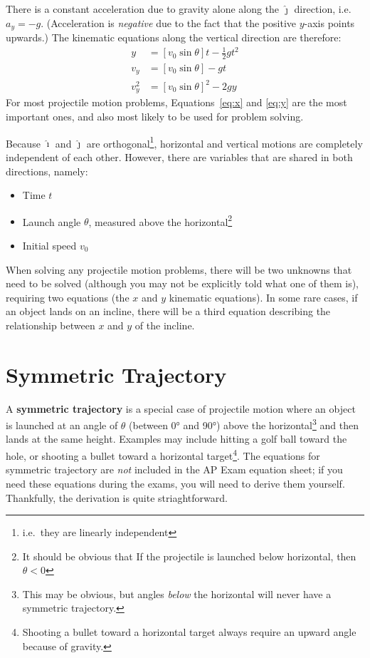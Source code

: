 \documentclass{../../../oss-handout}
\newcommand{\iii}{\bm{\hat{\imath}}}
\newcommand{\jjj}{\bm{\hat{\jmath}}}
\begin{document}
There is a constant acceleration due to gravity alone along the $\jjj$
direction, i.e.\ $a_y=-g$. (Acceleration is \emph{negative} due to the fact that
the positive $y$-axis points upwards.) The kinematic equations along the
vertical direction are therefore:
\begin{align}
  y &= \left[v_0\sin\theta\right]t-\frac12gt^2\label{eq:y}\\
  v_y &= \left[v_0\sin\theta\right] -gt\\
  v_y^2&=\left[v_0\sin\theta\right]^2-2gy
\end{align}
For most projectile motion problems, Equations~\ref{eq:x} and \ref{eq:y} are
the most important ones, and also most likely to be used for problem solving.

Because $\iii$ and $\jjj$ are orthogonal\footnote{i.e.\ they are linearly
  independent}, horizontal and vertical motions are completely independent of
each other. However, there are variables that are shared in both directions,
namely:
\begin{itemize}[nosep]
\item Time $t$
\item Launch angle $\theta$, measured above the horizontal\footnote{It should
  be obvious that If the projectile is launched below horizontal, then
  $\theta<0$}
\item Initial speed $v_0$
\end{itemize}
When solving any projectile motion problems, there will be two unknowns that
need to be solved (although you may not be explicitly told what one of them
is), requiring two equations (the $x$ and $y$ kinematic equations). In some
rare cases, if an object lands on an incline, there will be a third equation
describing the relationship between $x$ and $y$ of the incline.

\section{Symmetric Trajectory}
A \textbf{symmetric trajectory} is a special case of projectile motion where an
object is launched at an angle of $\theta$ (between \ang{0} and \ang{90}) above
the horizontal\footnote{This may be obvious, but angles \emph{below} the 
  horizontal will never have a symmetric trajectory.} and then lands at the
same height. Examples may include hitting a golf ball toward the hole, or
shooting a bullet toward a horizontal target\footnote{Shooting a bullet toward
  a horizontal target always require an upward angle because of gravity.}. The
equations for symmetric trajectory are \emph{not} included in the AP Exam
equation sheet; if you need these equations during the exams, you will need to
derive them yourself. Thankfully, the derivation is quite striaghtforward.
\end{document}
